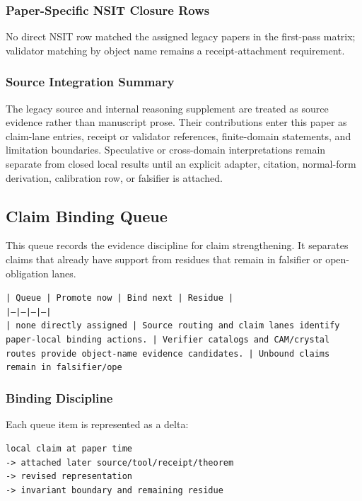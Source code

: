 \documentclass[11pt]{article}
\begin{document}
\subsubsection*{Paper-Specific NSIT Closure Rows}

No direct NSIT row matched the assigned legacy papers in the first-pass matrix; validator matching by object name remains a receipt-attachment requirement.

\subsubsection*{Source Integration Summary}

The legacy source and internal reasoning supplement are treated as source
evidence rather than manuscript prose. Their contributions enter this paper as
claim-lane entries, receipt or validator references, finite-domain statements,
and limitation boundaries. Speculative or cross-domain interpretations remain
separate from closed local results until an explicit adapter, citation,
normal-form derivation, calibration row, or falsifier is attached.
\subsection*{Claim Binding Queue}

This queue records the evidence discipline for claim strengthening. It separates claims that already have support from residues that remain in falsifier or open-obligation lanes.

\noindent\texttt{| Queue | Promote now | Bind next | Residue |}\\
\noindent\texttt{|---|---|---|---|}\\
\noindent\texttt{| none directly assigned | Source routing and claim lanes identify paper-local binding actions. | Verifier catalogs and CAM/crystal routes provide object-name evidence candidates. | Unbound claims remain in falsifier/ope}\\

\subsubsection*{Binding Discipline}

Each queue item is represented as a delta:

\begin{verbatim}
local claim at paper time
-> attached later source/tool/receipt/theorem
-> revised representation
-> invariant boundary and remaining residue
\end{verbatim}
\end{document}
